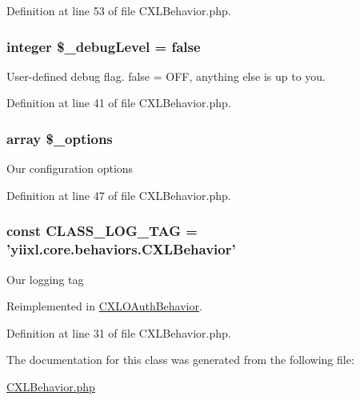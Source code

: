 Definition at line 53 of file CXLBehavior.php.

\hypertarget{classCXLBehavior_aa658930951c1fb5a0640c326c54297c1}{
\subsubsection[{\$\_\-debugLevel}]{\setlength{\rightskip}{0pt plus 5cm}integer \$\_\-debugLevel = false}}
\label{classCXLBehavior_aa658930951c1fb5a0640c326c54297c1}
User-\/defined debug flag. false = OFF, anything else is up to you. 

Definition at line 41 of file CXLBehavior.php.

\hypertarget{classCXLBehavior_ab0cd304a53a2640dc4f15e8d6100612f}{
\subsubsection[{\$\_\-options}]{\setlength{\rightskip}{0pt plus 5cm}array \$\_\-options}}
\label{classCXLBehavior_ab0cd304a53a2640dc4f15e8d6100612f}
Our configuration options 

Definition at line 47 of file CXLBehavior.php.

\hypertarget{classCXLBehavior_aa607ab5e557e6ebb60b85c5a20ad067f}{
\subsubsection[{CLASS\_\-LOG\_\-TAG}]{\setlength{\rightskip}{0pt plus 5cm}const {\bf CLASS\_\-LOG\_\-TAG} = 'yiixl.core.behaviors.CXLBehavior'}}
\label{classCXLBehavior_aa607ab5e557e6ebb60b85c5a20ad067f}
Our logging tag 

Reimplemented in \hyperlink{classCXLOAuthBehavior_aa607ab5e557e6ebb60b85c5a20ad067f}{CXLOAuthBehavior}.



Definition at line 31 of file CXLBehavior.php.



The documentation for this class was generated from the following file:\begin{DoxyCompactItemize}
\item 
\hyperlink{CXLBehavior_8php}{CXLBehavior.php}\end{DoxyCompactItemize}

